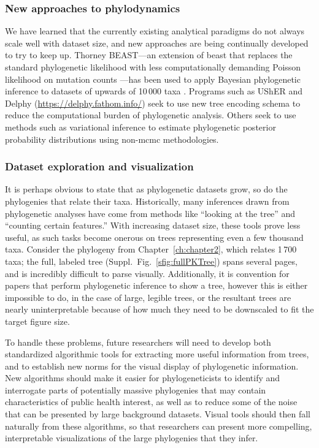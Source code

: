 \subsubsection{New approaches to phylodynamics}
We have learned that the currently existing analytical paradigms do not always scale well with dataset size, and new approaches are being continually developed to try to keep up.
Thorney BEAST---an extension of \gls{beast} that replaces the standard phylogenetic likelihood with less computationally demanding Poisson likelihood on mutation counts \citep{thorne1998estimating}---has been used to apply Bayesian phylogenetic inference to datasets of upwards of 10\,000 taxa \citep{du2021establishment}.
Programs such as UShER \citep{turakhia2021ultrafast} and Delphy (\url{https://delphy.fathom.info/}) seek to use new tree encoding schema to reduce the computational burden of phylogenetic analysis.
Others seek to use methods such as variational inference \cite{zhang2019variational} to estimate phylogenetic posterior probability distributions using non-\gls{mcmc} methodologies.

\subsubsection{Dataset exploration and visualization}
It is perhaps obvious to state that as phylogenetic datasets grow, so do the phylogenies that relate their taxa.
Historically, many inferences drawn from phylogenetic analyses have come from methods like ``looking at the tree'' and ``counting certain features.''
With increasing dataset size, these tools prove less useful, as such tasks become onerous on trees representing even a few thousand taxa.
Consider the phylogeny from Chapter~\ref{ch:chapter2}, which relates 1\,700 taxa; the full, labeled tree (Suppl.~Fig.~\ref{sfig:fullPKTree}) spans several pages, and is incredibly difficult to parse visually.
Additionally, it is convention for papers that perform phylogenetic inference to show a tree, however this is either impossible to do, in the case of large, legible trees, or the resultant trees are nearly uninterpretable because of how much they need to be downscaled to fit the target figure size.

To handle these problems, future researchers will need to develop both standardized algorithmic tools for extracting more useful information from trees, and to establish new norms for the visual display of phylogenetic information.
New algorithms should make it easier for phylogeneticists to identify and interrogate parts of potentially massive phylogenies that may contain characteristics of public health interest, as well as to reduce some of the noise that can be presented by large background datasets.
Visual tools should then fall naturally from these algorithms, so that researchers can present more compelling, interpretable visualizations of the large phylogenies that they infer.

